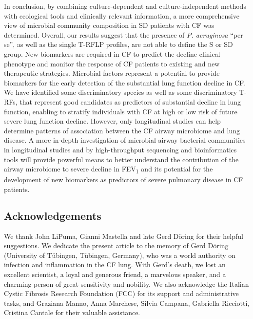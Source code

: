 In conclusion, by combining culture-dependent and culture-independent methods with ecological tools and clinically relevant information, a more comprehensive view of microbial community composition in SD patients with CF was determined. Overall, our results suggest that the presence of \textit{P. aeruginosa} ``per se'', as well as the single T-RFLP profiles, are not able to define the S or SD group. New biomarkers are required in CF to predict the decline clinical phenotype and monitor the response of CF patients to existing and new therapeutic strategies. Microbial factors represent a potential to provide biomarkers for the early detection of the substantial lung function decline in CF. We have identified some discriminatory species as well as some discriminatory T-RFs, that represent good candidates as predictors of substantial decline in lung function, enabling to stratify individuals with CF at high or low risk of future severe lung function decline. However, only longitudinal studies can help determine patterns of association between the CF airway microbiome and lung disease. A more in-depth investigation of microbial airway bacterial communities in longitudinal studies and by high-throughput sequencing and bioinformatics tools will provide powerful means to better understand the contribution of the airway microbiome to severe decline in FEV\textsubscript{1} and its potential for the development of new biomarkers as predictors of severe pulmonary disease in CF patients.\\

\subsection{Acknowledgements} We thank John LiPuma, Gianni Mastella and late Gerd D\"oring for their helpful suggestions. We dedicate the present article to the memory of Gerd D\"oring (University of T\"ubingen, T\"ubingen, Germany), who was a world authority on infection and inflammation in the CF lung. With Gerd's death, we lost an excellent scientist, a loyal and generous friend, a marvelous speaker, and a charming person of great sensitivity and nobility. We also acknowledge the Italian Cystic Fibrosis Research Foundation (FCC) for its support and administrative tasks, and Graziana Manno, Anna Marchese, Silvia Campana, Gabriella Ricciotti, Cristina Cantale for their valuable assistance. \\


